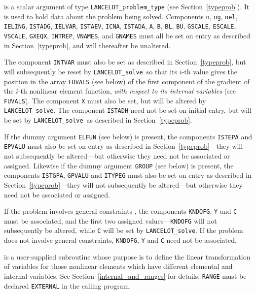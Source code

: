 \documentclass{galahad}
\newcommand{\fullpackagename}{LANC\-E\-LOT}
\newcommand{\solver}{{\tt \fullpackagename\_solve}}
\begin{document}
\begin{description}

 is a scalar \intentinout argument of type
{\tt \fullpackagename\_problem\_type}
(see Section~\ref{typeprob}).
It is used to hold data about the problem being solved.
Components
{\tt n},
{\tt ng},
{\tt nel},
{\tt IELING},
{\tt ISTADG},
{\tt IELVAR},
{\tt ISTAEV},
{\tt ICNA},
{\tt ISTADA},
{\tt A},
{\tt B},
{\tt BL},
{\tt BU},
{\tt GSCALE},
{\tt ESCALE},
{\tt VSCALE},
{\tt GXEQX},
{\tt INTREP},
{\tt VNAMES}, and
{\tt GNAMES}
must all be set on entry as described in Section~\ref{typeprob}, and
will thereafter be unaltered.

The component {\tt INTVAR} must also be set as
described in Section~\ref{typeprob}, but will subsequently be reset by \solver\
so that its $i$-th value
gives the position in the array {\tt FUVALS} (see below)
of the first component of
the gradient of the $i$-th nonlinear element function, {\em with respect
to its internal variables} (see {\tt FUVALS}).
The component {\tt X} must also be set, but will be altered by \solver.
The component {\tt ISTADH} need not be set on initial entry, but will
be set by \solver\ as described in Section~\ref{typeprob}.

If the dummy argument {\tt ELFUN} (see below) is present,
the components {\tt ISTEPA} and {\tt EPVALU} must also be
set on entry as described in Section~\ref{typeprob}---they will
not subsequently be altered---but otherwise they need not be
associated or assigned.
Likewise if the dummy argument {\tt GROUP} (see below) is present,
the components {\tt ISTGPA}, {\tt GPVALU} and {\tt ITYPEG} must also be
set on entry as described in Section~\ref{typeprob}---they will
not subsequently be altered---but otherwise they need not be
associated or assigned.

If the problem involves general constraints ,
the components {\tt KNDOFG}, {\tt Y} and {\tt C} must be associated, and
the first two assigned values---{\tt KNDOFG} will not subsequently be
altered, while {\tt C} will be set by \solver.
If the problem does not involve general
constraints, {\tt KNDOFG}, {\tt Y} and {\tt C}
need not be associated.

 is a user-supplied subroutine whose purpose is to
define the linear transformation of variables for those nonlinear
elements which have different elemental and internal variables.
See Section~\ref{internal_and_ranges} for details.
{\tt RANGE}  must be declared {\tt EXTERNAL} in the calling program.


\end{description}
\end{document}
